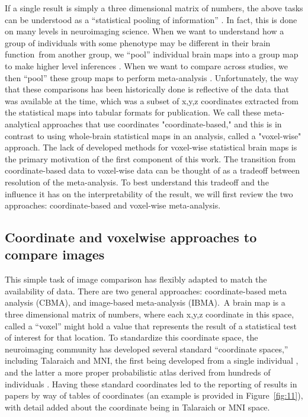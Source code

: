 \documentclass{report}
\begin{document}
If a single result is simply a three dimensional matrix of numbers, the
above tasks can be understood as a ``statistical pooling of
information'' \cite{Lazar2002-dk}.
In fact, this is done on many levels in neuroimaging science. When we
want to understand how a group of individuals with some phenotype may be
different in their brain function~from another group, we ``pool''
individual brain maps into a group map to make higher level inferences \cite{Smith2004-lw}.
When we want to compare across studies, we then ``pool'' these group
maps to perform meta-analysis \cite{Costafreda2009-ys}. Unfortunately, the way that these comparisons has been historically done is reflective of the data that was available at the time, which was a subset of x,y,z coordinates extracted from the statistical maps into tabular formats for publication. We call these meta-analytical approaches that use coordinates "coordinate-based," and this is in contrast to using whole-brain statistical maps in an analysis, called a "voxel-wise" approach. The lack of developed methods for voxel-wise statistical brain maps is the primary motivation of the first component of this work. The transition from coordinate-based data to voxel-wise data can be thought of as a tradeoff between resolution of the meta-analysis. To best understand this tradeoff and the influence it has on the interpretability of the result, we will first review the two approaches: coordinate-based and voxel-wise meta-analysis.

\subsection{Coordinate and voxelwise approaches to compare images}

This simple task of image comparison has flexibly adapted to match the
availability of data. There are two general approaches: coordinate-based
meta analysis (CBMA), and image-based meta-analysis (IBMA).~A brain map
is a three dimensional matrix of numbers, where each x,y,z coordinate in
this space, called a ``voxel'' might hold a value that represents the
result of a statistical test of interest for that location. To
standardize this coordinate space, the neuroimaging community has
developed several standard ``coordinate spaces,'' including Talaraich
and MNI, the first being developed from a single individual \cite{Talairach1988-os},
and the latter a more proper probabilistic atlas derived from hundreds
of individuals \cite{Mazziotta1995-gn,Brett2001-gk}.
Having these standard coordinates led to the reporting of results in
papers by way of tables of coordinates (an example is provided in Figure~\ref{fig:11}), with detail added about the coordinate being in Talaraich or MNI
space.
\end{document}
